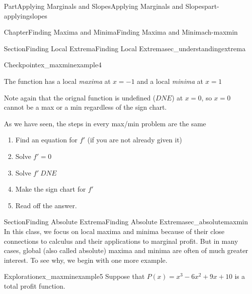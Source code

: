 \documentclass[oneside,10pt,]{tufte-book}
\numberwithin{equation}{chapter}
\begin{document}
\begin{partptx}{Part}{Applying Marginals and Slopes}{}{Applying Marginals and Slopes}{}{}{part-applyingslopes}
\begin{chapterptx}{Chapter}{Finding Maxima and Minima}{}{Finding Maxima and Minima}{}{}{ch-maxmin}
\begin{sectionptx}{Section}{Finding Local Extrema}{}{Finding Local Extrema}{}{}{sec_understandingextrema}
\begin{inlineexercise}{Checkpoint}{}{ex_maxminexample4}
\begin{image}{0.125}{0.75}{0.125}{}
{
}%
\end{image}%
%
\par
The function has a local \emph{maxima} at \(x=-1\) and a local \emph{minima} at \(x=1\)%
\par
Note again that the orignal function is undefined (\(DNE\)) at \(x=0\), so \(x=0\) cannot be a max or a min regardless of the sign chart.%
\end{inlineexercise}%
As we have seen, the steps in every max\slash{}min problem are the same%
\begin{enumerate}
\item{}Find an equation for \(f'\) (if you are not already given it)%
\item{}Solve \(f'=0\)%
\item{}Solve \(f'\ DNE\)%
\item{}Make the sign chart for \(f'\)%
\item{}Read off the answer.%
\end{enumerate}
%
\end{sectionptx}
%
%
\typeout{************************************************}
\typeout{************************************************}
%
\begin{sectionptx}{Section}{Finding Absolute Extrema}{}{Finding Absolute Extrema}{}{}{sec_absolutemaxmin}
In this class, we focus on local maxima and minima because of their close connections to calculus and their applications to marginal profit. But in many cases, global (also called absolute) maxima and minima are often of much greater interest. To see why, we begin with one more example.%
\begin{exploration}{Exploration}{}{ex_maxminexample5}%
Suppose that \(P(x) = x^3 - 6x^2 + 9x +10 \) is a total profit function.%
\begin{enumerate}[font=\bfseries,label=(\alph*),ref=\alph*]%

\end{enumerate}
\end{exploration}
\end{sectionptx}
\end{chapterptx}
\end{partptx}
\end{document}
